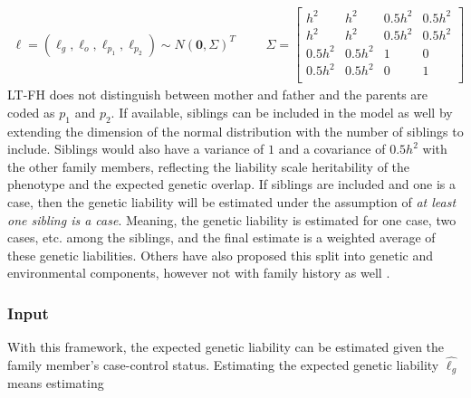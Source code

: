 \begin{align}\label{eq:LTFH_model}
\ell = \left( \ell_g, \ell_o, \ell_{p_1}, \ell_{p_2} \right) \sim N(\mathbf{0}, \Sigma)^T & & &\Sigma = \begin{bmatrix}
h^2	&	h^2	&	0.5h^2	&	0.5h^2	\\
h^2 &	h^2 &	0.5h^2	&	0.5h^2	\\
0.5h^2	&	0.5h^2	&	1	&	0	\\
0.5h^2	&	0.5h^2	&	0	&	1	\\
\end{bmatrix}
\end{align}
LT-FH does not distinguish between mother and father and the parents are coded as $ p_1 $ and $ p_2 $. If available, siblings can be included in the model as well by extending the dimension of the normal distribution with the number of siblings to include. Siblings would also have a variance of $ 1 $ and a covariance of $ 0.5h^2 $ with the other family members, reflecting the liability scale heritability of the phenotype and the expected genetic overlap. If siblings are included and one is a case, then the genetic liability will be estimated under the assumption of \textit{at least one sibling is a case}. Meaning, the genetic liability is estimated for one case, two cases, etc. among the siblings, and the final estimate is a weighted average of these genetic liabilities. Others have also proposed this split into genetic and environmental components, however not with family history as well \cite{weissbrod2015accurate}.

\subsubsection{Input}

With this framework, the expected genetic liability can be estimated given the family member's case-control status. Estimating the expected genetic liability $ \hat{\ell_g} $ means estimating 

